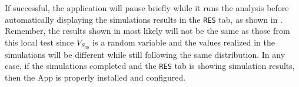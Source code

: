 
If successful, the application will pause briefly while it runs the
analysis before automatically displaying the simulations results in
the \texttt{RES} tab, as shown
in . Remember, the results shown
in  most likely will not be the same as
those from this local test since $V_{S_{30}}$ is a random variable and
the values realized in the simulations will be different while still
following the same distribution. In any case, if the simulations
completed and the \texttt{RES} tab is showing simulation results, then
the \texttt{\getsoftwarename{}} App is properly installed and configured.
